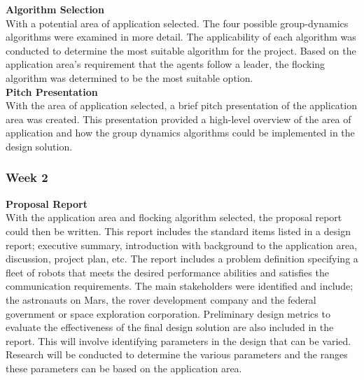 \documentclass[../CourseManual.tex]{subfiles}
\begin{document}

\textbf{Algorithm Selection}\\
With a potential area of application selected. The four possible group-dynamics algorithms were examined in more detail. The applicability of each algorithm was conducted to determine the most suitable algorithm for the project. Based on the application area's requirement that the agents follow a leader, the flocking algorithm was determined to be the most suitable option.\\

\textbf{Pitch Presentation}\\
With the area of application selected, a brief pitch presentation of the application area was created. This presentation provided a high-level overview of the area of application and how the group dynamics algorithms could be implemented in the design solution. 

\subsubsection{Week 2} \label{Week 2: Flocking}
\textbf{Proposal Report}\\
With the application area and flocking algorithm selected, the proposal report could then be written. This report includes the standard items listed in a design report; executive summary, introduction with background to the application area, discussion, project plan, etc. The report includes a problem definition specifying a fleet of robots that meets the desired performance abilities and satisfies the communication requirements. The main stakeholders were identified and include; the astronauts on Mars, the rover development company and the federal government or space exploration corporation. Preliminary design metrics to evaluate the effectiveness of the final design solution are also included in the report. This will involve identifying parameters in the design that can be varied. Research will be conducted to determine the various parameters and the ranges these parameters can be based on the application area.\\
\end{document}
